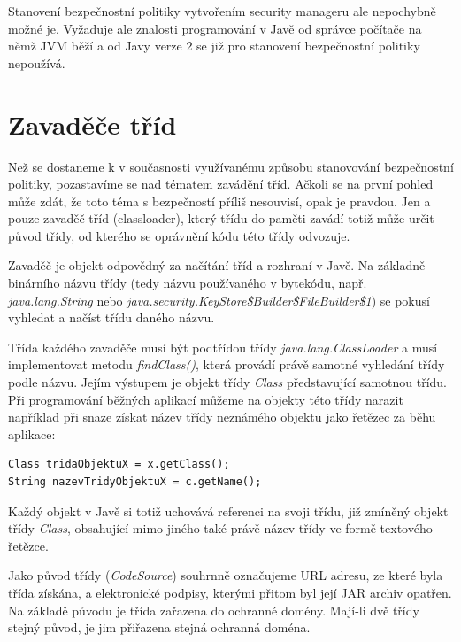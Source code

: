 Stanovení bezpečnostní politiky vytvořením security manageru ale nepochybně možné je. Vyžaduje ale znalosti programování v Javě od správce počítače na němž JVM běží a od Javy verze 2 se již pro stanovení bezpečnostní politiky nepoužívá.

\section{Zavaděče tříd}

Než se dostaneme k v současnosti využívanému způsobu stanovování bezpečnostní politiky, pozastavíme se nad tématem zavádění tříd.
Ačkoli se na první pohled může zdát, že toto téma s bezpečností příliš nesouvisí, opak je pravdou.
Jen a pouze zavaděč tříd (classloader), který třídu do paměti zavádí totiž může určit původ třídy, od kterého se oprávnění kódu této třídy odvozuje.

Zavaděč je objekt odpovědný za načítání tříd a rozhraní v Javě. Na základně binárního názvu třídy (tedy názvu používaného v bytekódu, např. {\it java.lang.String} nebo {\it java.security.KeyStore\$Builder\$FileBuilder\$1}) se pokusí vyhledat a načíst třídu daného názvu. \cite{refClassLoader}

Třída každého zavaděče musí být podtřídou třídy {\it java.lang.ClassLoader} a musí implementovat metodu {\it findClass()}, která provádí právě samotné vyhledání třídy podle názvu. Jejím výstupem je objekt třídy {\it Class} představující samotnou třídu. Při programování běžných aplikací můžeme na objekty této třídy narazit například při snaze získat název třídy neznámého objektu jako řetězec za běhu aplikace: \cite{refClassLoader}

\begin{verbatim}
Class tridaObjektuX = x.getClass();
String nazevTridyObjektuX = c.getName();
\end{verbatim}

Každý objekt v Javě si totiž uchovává referenci na svoji třídu, již zmíněný objekt třídy {\it Class}, obsahující mimo jiného také právě název třídy ve formě textového řetězce.

Jako původ třídy ({\it CodeSource}) souhrnně označujeme URL adresu, ze které byla třída získána, a elektronické podpisy, kterými přitom byl její JAR archiv opatřen.
Na základě původu je třída zařazena do ochranné domény. Mají-li dvě třídy stejný původ, je jim přiřazena stejná ochranná doména. \cite[5.1]{oaks}\cite{sourceSecureClassLoader}

